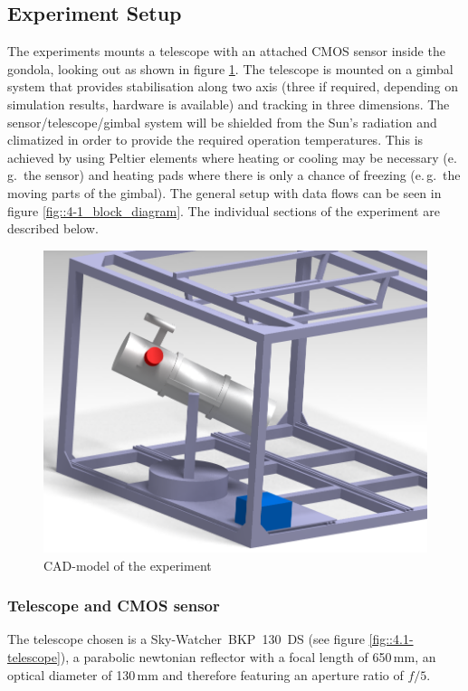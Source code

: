 \subsection{Experiment Setup} \label{Experiment_Setup}




The experiments mounts a telescope with an attached CMOS sensor inside the gondola, looking out as shown in figure \ref{fig::4-1_CAD}. The telescope is mounted on a gimbal system that provides stabilisation along two axis (three if required, depending on simulation results, hardware is available) and tracking in three dimensions. The sensor/telescope/gimbal system will be shielded from the Sun's radiation and climatized in order to provide the required operation temperatures. This is achieved by using Peltier elements where heating or cooling may be necessary (e.\,g.~the sensor) and heating pads where there is only a chance of freezing (e.\,g.~the moving parts of the gimbal). The general setup with data flows can be seen in figure \ref{fig::4-1_block_diagram}. The individual sections of the experiment are described below.

\begin{figure}[h]
	\centering
	\includegraphics[width=0.7\linewidth]{4-experiment-design/img/setup/Assembly_3}
	\caption{CAD-model of the experiment}
	\label{fig::4-1_CAD}
\end{figure}


\subsubsection{Telescope and CMOS sensor}
The telescope chosen is a Sky-Watcher~BKP~130~DS (see figure \ref{fig::4.1-telescope}), a parabolic newtonian reflector with a focal length of 650\,mm, an optical diameter of 130\,mm and therefore featuring an aperture ratio of $f/5$. 


